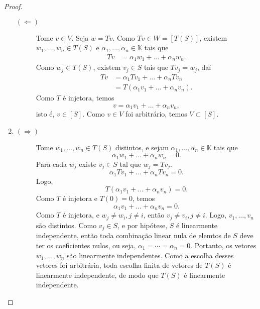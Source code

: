 \documentclass{article}
\newcommand{\K}{\mathbb{K}}
\begin{document}
\begin{proof}
\begin{enumerate}
\begin{description}
      \item[$(\Leftarrow)$]
        Tome $v\in V$. Seja $w=Tv$. Como
        $Tv\in W=[T(S)]$, existem $w_1,\dots,w_n\in T(S)$ e
        $\alpha_1,\dots,\alpha_n\in\K$ tais que
        \begin{align*}
          Tv & = \alpha_1w_1+\dots+\alpha_nw_n.
        \end{align*}
        Como $w_j\in T(S)$, existem $v_j\in S$ tais que
        $Tv_j = w_j$, daí
        \begin{align*}
          Tv & = \alpha_1Tv_1+\dots+\alpha_nTv_n \\
          & = T(\alpha_1v_1+\dots+\alpha_nv_n).
        \end{align*}
        Como $T$ é injetora, temos
        $$ v = \alpha_1v_1 + \dots + \alpha_nv_n, $$
        isto é, $v\in [S]$. Como $v\in V$ foi arbitrário, temos
        $V\subset[S]$.
    \end{description}
    \item
    \begin{description}
      \item[$(\Rightarrow)$]
        Tome $w_1,\dots,w_n \in T(S)$ distintos, e sejam
        $\alpha_1,\dots,\alpha_n\in\K$ tais que
        $$ \alpha_1w_1 + \dots + \alpha_nw_n = 0.$$
        Para cada $w_j$ existe $v_j\in S$ tal que $w_j = Tv_j$.
        $$ \alpha_1Tv_1 + \dots + \alpha_nTv_n = 0.$$
        Logo,
        $$ T(\alpha_1v_1 + \dots + \alpha_nv_n) = 0.$$
        Como $T$ é injetora e $T(0) = 0$, temos
        $$ \alpha_1v_1 + \dots + \alpha_nv_n = 0. $$
        Como $T$ é injetora, e $w_j\neq w_i, j\neq i$, então
        $v_j\neq v_i, j\neq i$. Logo, $v_1,\dots,v_n$ são distintos.
        Como $v_j\in S$, e por hipótese, $S$ é linearmente independente,
        então toda combinação linear nula de elemtos de $S$ deve
        ter os coeficientes nulos, ou seja,
        $\alpha_1 = \cdots = \alpha_n = 0$.
        Portanto, os vetores $w_1,\dots,w_n$ são linearmente independentes.
        Como a escolha desses vetores foi arbitrária, toda escolha finita de
        vetores de $T(S)$ é linearmente independente, de modo que $T(S)$ é
        linearmente independente.


\end{description}
\end{enumerate}
\end{proof}
\end{document}
